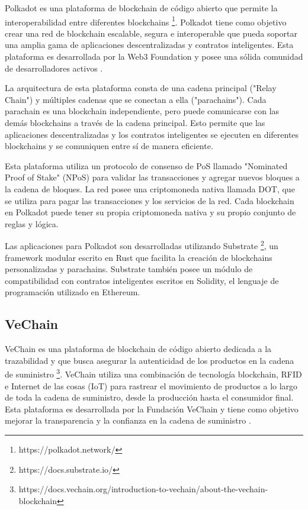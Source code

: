 \documentclass[theoretical-framework.tex]{subfiles}
\begin{document}
Polkadot es una plataforma de blockchain de código abierto que permite la interoperabilidad entre diferentes blockchains \footnote{https://polkadot.network/}. Polkadot tiene como objetivo crear una red de blockchain escalable, segura e interoperable que pueda soportar una amplia gama de aplicaciones descentralizadas y contratos inteligentes. Esta plataforma es desarrollada por la Web3 Foundation y posee una sólida comunidad de desarrolladores activos \cite{wood2016polkadot}.

La arquitectura de esta plataforma consta de una cadena principal ("Relay Chain") y múltiples cadenas que se conectan a ella ("parachains"). Cada parachain es una blockchain independiente, pero puede comunicarse con las demás blockchains a través de la cadena principal. Esto permite que las aplicaciones descentralizadas y los contratos inteligentes se ejecuten en diferentes blockchains y se comuniquen entre sí de manera eficiente. 

Esta plataforma utiliza un protocolo de consenso de PoS llamado "Nominated Proof of Stake" (NPoS) para validar las transacciones y agregar nuevos bloques a la cadena de bloques. La red posee una criptomoneda nativa llamada DOT, que se utiliza para pagar las transacciones y los servicios de la red. Cada blockchain en Polkadot puede tener su propia criptomoneda nativa y su propio conjunto de reglas y lógica.

Las aplicaciones para Polkadot son desarrolladas utilizando Substrate \footnote{https://docs.substrate.io/}, un framework modular escrito en Rust que facilita la creación de blockchains personalizadas y parachains. Substrate también posee un módulo de compatibilidad con contratos inteligentes escritos en Solidity, el lenguaje de programación utilizado en Ethereum.

\subsection{VeChain}

VeChain es una plataforma de blockchain de código abierto dedicada a la trazabilidad y que busca asegurar la autenticidad de los productos en la cadena de suministro \footnote{https://docs.vechain.org/introduction-to-vechain/about-the-vechain-blockchain}. VeChain utiliza una combinación de tecnología blockchain, RFID e Internet de las cosas (IoT) para rastrear el movimiento de productos a lo largo de toda la cadena de suministro, desde la producción hasta el consumidor final. Esta plataforma es desarrollada por la Fundación VeChain y tiene como objetivo mejorar la transparencia y la confianza en la cadena de suministro \cite{she2022vechain}.
\end{document}
